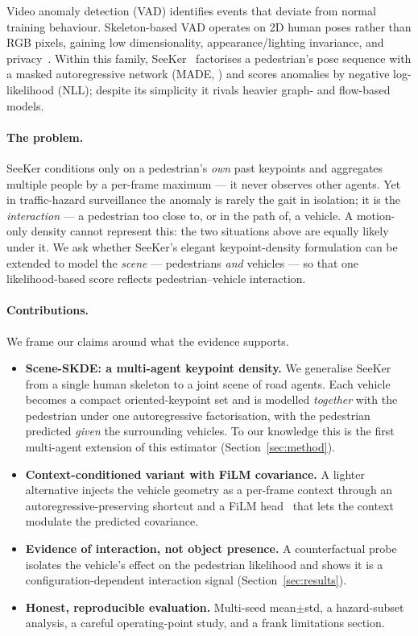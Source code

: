 \documentclass{article}
\begin{document}
Video anomaly detection (VAD) identifies events that deviate from normal
training behaviour. Skeleton-based VAD operates on 2D human poses rather than
RGB pixels, gaining low dimensionality, appearance/lighting invariance, and
privacy~\citep{morais2019messagepassing,markovitz2020graph,hirschorn2023normalizing}.
Within this family, SeeKer~\citep{delic2025seeker} factorises a pedestrian's
pose sequence with a masked autoregressive network (MADE,
\citealp{germain2015made}) and scores anomalies by negative log-likelihood
(NLL); despite its simplicity it rivals heavier graph- and flow-based models.

\paragraph{The problem.} SeeKer conditions only on a pedestrian's \emph{own}
past keypoints and aggregates multiple people by a per-frame maximum --- it
never observes other agents. Yet in traffic-hazard surveillance the anomaly is
rarely the gait in isolation; it is the \emph{interaction} --- a pedestrian too
close to, or in the path of, a vehicle. A motion-only density cannot represent
this: the two situations above are equally likely under it. We ask whether
SeeKer's elegant keypoint-density formulation can be extended to model the
\emph{scene} --- pedestrians \emph{and} vehicles --- so that one likelihood-based
score reflects pedestrian--vehicle interaction.

\paragraph{Contributions.} We frame our claims around what the evidence supports.
\begin{itemize}\itemsep2pt
  \item \textbf{Scene-SKDE: a multi-agent keypoint density.} We generalise
  SeeKer from a single human skeleton to a joint scene of road agents. Each
  vehicle becomes a compact oriented-keypoint set and is modelled \emph{together}
  with the pedestrian under one autoregressive factorisation, with the pedestrian
  predicted \emph{given} the surrounding vehicles. To our knowledge this is the
  first multi-agent extension of this estimator (Section~\ref{sec:method}).
  \item \textbf{Context-conditioned variant with FiLM covariance.} A lighter
  alternative injects the vehicle geometry as a per-frame context through an
  autoregressive-preserving shortcut and a FiLM head~\citep{perez2018film} that
  lets the context modulate the predicted covariance.
  \item \textbf{Evidence of interaction, not object presence.} A counterfactual
  probe isolates the vehicle's effect on the pedestrian likelihood and shows it is
  a configuration-dependent interaction signal (Section~\ref{sec:results}).
  \item \textbf{Honest, reproducible evaluation.} Multi-seed mean$\pm$std, a
  hazard-subset analysis, a careful operating-point study, and a frank
  limitations section.
\end{itemize}
\end{document}
